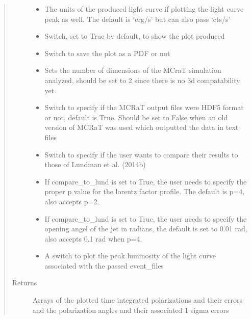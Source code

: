 \documentclass[letterpaper,10pt,english]{sphinxmanual}
\begin{document}
\begin{fulllineitems}
\begin{quote}
\begin{description}
\begin{itemize}
\item {} 
 \textendash{} The units of the produced light curve if plotting the light curve peak as well. The default is ‘erg/s’
but can also pass ‘cts/s’

\item {} 
 \textendash{} Switch, set to True by default, to show the plot produced

\item {} 
 \textendash{} Switch to save the plot as a PDF or not

\item {} 
 \textendash{} Sets the number of dimensions of the MCraT simulation analyzed, should be set to 2 since there is no 3d
compatability yet.

\item {} 
 \textendash{} Switch to specify if the MCRaT output files were HDF5 format or not, default is True. Should be set to
False when an old version of MCRaT was used which outputted the data in text files

\item {} 
 \textendash{} Switch to specify if the user wants to compare their results to those of
Lundman et al. (2014b)

\item {} 
 \textendash{} If compare\_to\_lund is set to True, the user needs to specify the proper p value for the lorentz factor
profile. The default is p=4, also accepts p=2.

\item {} 
 \textendash{} If compare\_to\_lund is set to True, the user needs to specify the opening angel of the jet in radians,
the default is set to 0.01 rad, also accepts 0.1 rad when p=4.

\item {} 
 \textendash{} A switch to plot the peak luminosity of the light curve associated with the passed event\_files

\end{itemize}

\item[{Returns}] \leavevmode
Arrays of the plotted time integrated polarizations and their errors and the polarization angles and their
associated 1 sigma errors

\end{description}\end{quote}

\end{fulllineitems}
\end{document}
